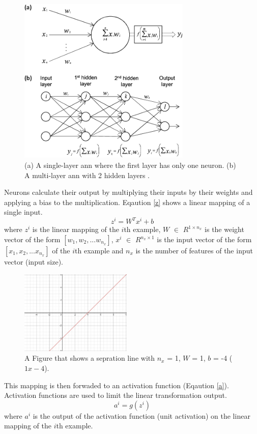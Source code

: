 \documentclass[runningheads]{llncs}
\begin{document}
\begin{figure}[H]
    \label{nn}
    \centering
    \includegraphics[height=8cm]{nn}
    \caption{(a) A single-layer \gls{ann} where the first layer has only one neuron. 
    (b) A multi-layer \gls{ann} with 2 hidden layers \cite{nnimage}. }
\end{figure}

Neurons calculate their output by multiplying their inputs by their weights and applying a bias to the multiplication. Eqaution \ref{z}
shows a linear mapping of a single input.
\begin{equation}
\label{z}
    z^i = W^Tx^i + b
\end{equation}
where $z^i$ is the linear mapping of the $i$th example,  $W$ $\in$ $ R^{1 \times n_{x}} $ is the weight vector of the form $[w_1, w_2, ... w_{n_{x}}]$, 
$x^i$ $\in$ $ R^{n_{x}\times1} $ is the input vector of the form $[x_1, x_2, ... x_{n_{x}}]$ of the $i$th example and $n_{x}$ is the number
of features of the input vector (input size).

\begin{figure}[H]
    \label{exsep}
    \centering
    \includegraphics[height=4cm]{sepfig}
    \caption{A Figure that shows a sepration line with $n_{x}$ = 1, $W$ = 1, $b$ = -4
    ($1x-4$).}
\end{figure}

This mapping is then forwaded to an activation function (Eqaution \ref{a}).
Activation functions are used to limit the linear transformation output.
\begin{equation}
    \label{a}
        a^i = g(z^i)
\end{equation}
where $a^i$ is the output of the activation function (unit activation) on the linear mapping of the $i$th example.
\end{document}
